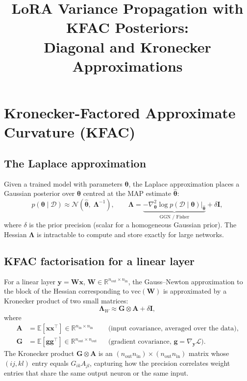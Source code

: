\documentclass[11pt]{article}
\title{LoRA Variance Propagation with KFAC Posteriors:\\
       Diagonal and Kronecker Approximations}
\date{}
\newcommand{\R}{\mathbb{R}}
\newcommand{\E}{\mathbb{E}}
\newcommand{\kron}{\otimes}
\begin{document}
\maketitle

\section{Kronecker-Factored Approximate Curvature (KFAC)}

\subsection{The Laplace approximation}

Given a trained model with parameters $\bm\theta$, the Laplace approximation
places a Gaussian posterior over $\bm\theta$ centred at the MAP estimate
$\hat{\bm\theta}$:
\begin{equation}
  p(\bm\theta \mid \mathcal{D}) \approx
  \mathcal{N}\!\left(\hat{\bm\theta},\; \bm\Lambda^{-1}\right), \qquad
  \bm\Lambda = \underbrace{-\nabla^2_{\bm\theta} \log p(\mathcal{D}\mid\bm\theta)\big|_{\hat{\bm\theta}}}_{\text{GGN / Fisher}} + \delta\bm I,
\end{equation}
where $\delta$ is the prior precision (scalar for a homogeneous Gaussian prior).
The Hessian $\bm\Lambda$ is intractable to compute and store exactly for large
networks.

\subsection{KFAC factorisation for a linear layer}

For a linear layer $\bm y = \bm W \bm x$, $\bm W \in \R^{n_\text{out}\times n_\text{in}}$,
the Gauss–Newton approximation to the block of the Hessian corresponding to
$\text{vec}(\bm W)$ is approximated by a Kronecker product of two small matrices:
\begin{equation}
  \bm\Lambda_W \approx \bm G \kron \bm A + \delta \bm I,
  \label{eq:kfac}
\end{equation}
where
\begin{align}
  \bm A &= \E\!\left[\bm x \bm x^\top\right] \in \R^{n_\text{in}\times n_\text{in}}
    & &\text{(input covariance, averaged over the data)}, \\
  \bm G &= \E\!\left[\bm g \bm g^\top\right] \in \R^{n_\text{out}\times n_\text{out}}
    & &\text{(gradient covariance, } \bm g = \nabla_{\bm y}\mathcal{L}\text{)}.
\end{align}
The Kronecker product $\bm G \kron \bm A$ is an $(n_\text{out} n_\text{in})
\times (n_\text{out} n_\text{in})$ matrix whose $(ij,kl)$ entry equals
$G_{ik} A_{jl}$, capturing how the precision correlates weight entries that
share the same output neuron or the same input.
\end{document}
